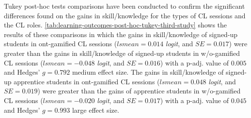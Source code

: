 Tukey post-hoc tests comparisons have been conducted to confirm the significant differences found on the gains in skill/knowledge for the types of CL sessions and the CL roles.
\autoref{tab:learning-outcomes-post-hoc-tukey-third-study} shows the results of these comparisons in which 
the gains in skill/knowledge of signed-up students in ont-gamified CL sessions ($lsmean=0.014$ \emph{logit}, and $SE = 0.017$) were greater than the gains in skill/knowledge of signed-up students in w/o-gamified CL sessions ($lsmean=-0.048$ \emph{logit}, and $SE = 0.016$) with a p-adj. value of $0.005$ and Hedges' $g=0.792$ medium effect size.
The gains in skill/knowledge of signed-up apprentice students in ont-gamified CL sessions ($lsmean=0.048$ \emph{logit}, and $SE = 0.019$) were greater than the gains of apprentice students in w/o-gamified CL sessions ($lsmean=-0.020$ \emph{logit}, and $SE = 0.017$) with a p-adj. value of $0.045$ and Hedges' $g=0.993$ large effect size.


